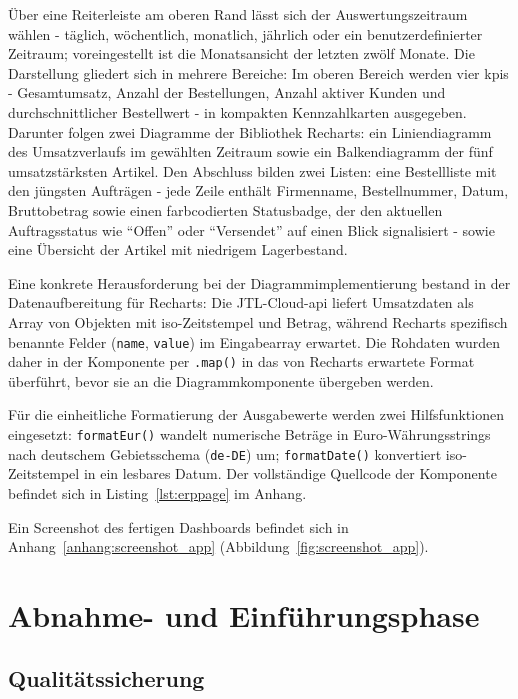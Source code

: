 \documentclass[11pt, a4paper, oneside]{report}
\begin{document}
Über eine Reiterleiste am oberen Rand lässt sich der Auswertungszeitraum wählen -
täglich, wöchentlich, monatlich, jährlich oder ein benutzerdefinierter Zeitraum;
voreingestellt ist die Monatsansicht der letzten zwölf Monate. Die Darstellung
gliedert sich in mehrere Bereiche: Im oberen Bereich werden vier
\glspl{kpi} - Gesamtumsatz, Anzahl der Bestellungen, Anzahl aktiver Kunden und
durchschnittlicher Bestellwert - in kompakten Kennzahlkarten ausgegeben. Darunter
folgen zwei Diagramme der Bibliothek Recharts: ein Liniendiagramm des Umsatzverlaufs
im gewählten Zeitraum sowie ein Balkendiagramm der fünf umsatzstärksten Artikel.
Den Abschluss bilden zwei Listen: eine Bestellliste mit den jüngsten Aufträgen -
jede Zeile enthält Firmenname, Bestellnummer, Datum, Bruttobetrag sowie einen
farbcodierten Statusbadge, der den aktuellen Auftragsstatus wie \enquote{Offen}
oder \enquote{Versendet} auf einen Blick signalisiert - sowie eine Übersicht der
Artikel mit niedrigem Lagerbestand.

Eine konkrete Herausforderung bei der Diagrammimplementierung bestand in der
Datenaufbereitung für Recharts: Die JTL-Cloud-\gls{api} liefert Umsatzdaten
als Array von Objekten mit \gls{iso}-Zeitstempel und Betrag, während Recharts
spezifisch benannte Felder (\texttt{name}, \texttt{value}) im Eingabearray
erwartet. Die Rohdaten wurden daher in der Komponente per \texttt{.map()}
in das von Recharts erwartete Format überführt, bevor sie an die
Diagrammkomponente übergeben werden.

Für die einheitliche Formatierung der Ausgabewerte werden zwei Hilfsfunktionen
eingesetzt: \texttt{formatEur()} wandelt numerische Beträge in Euro-Währungsstrings
nach deutschem Gebietsschema (\texttt{de-DE}) um; \texttt{formatDate()} konvertiert
\gls{iso}-Zeitstempel in ein lesbares Datum. Der vollständige Quellcode der Komponente
befindet sich in Listing~\ref{lst:erppage} im Anhang.

Ein Screenshot des fertigen Dashboards befindet sich in
Anhang~\ref{anhang:screenshot_app} (Abbildung~\ref{fig:screenshot_app}).

\chapter{Abnahme- und Einführungsphase}

\section{Qualitätssicherung}
\end{document}
